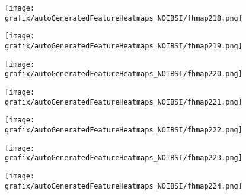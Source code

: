 \hspace{\hsp} 
\begin{subfigure}{\wid\textwidth} 
    \centering 
    \caption{\tiny \sffamily {}} 
    \vspace{\vsp} 
    \texttt{[image: grafix/autoGeneratedFeatureHeatmaps\_NOIBSI/fhmap218.png]} 
\end{subfigure} 
\hspace{\hsp} 
\begin{subfigure}{\wid\textwidth} 
    \centering 
    \caption{\tiny \sffamily {}} 
    \vspace{\vsp} 
    \texttt{[image: grafix/autoGeneratedFeatureHeatmaps\_NOIBSI/fhmap219.png]} 
\end{subfigure} 
\hspace{\hsp} 
\begin{subfigure}{\wid\textwidth} 
    \centering 
    \caption{\tiny \sffamily {}} 
    \vspace{\vsp} 
    \texttt{[image: grafix/autoGeneratedFeatureHeatmaps\_NOIBSI/fhmap220.png]} 
\end{subfigure} 
\hspace{\hsp} 
\begin{subfigure}{\wid\textwidth} 
    \centering 
    \caption{\tiny \sffamily {}} 
    \vspace{\vsp} 
    \texttt{[image: grafix/autoGeneratedFeatureHeatmaps\_NOIBSI/fhmap221.png]} 
\end{subfigure} 
\hspace{\hsp} 
\begin{subfigure}{\wid\textwidth} 
    \centering 
    \caption{\tiny \sffamily {}} 
    \vspace{\vsp} 
    \texttt{[image: grafix/autoGeneratedFeatureHeatmaps\_NOIBSI/fhmap222.png]} 
\end{subfigure} 
\hspace{\hsp} 
\begin{subfigure}{\wid\textwidth} 
    \centering 
    \caption{\tiny \sffamily {}} 
    \vspace{\vsp} 
    \texttt{[image: grafix/autoGeneratedFeatureHeatmaps\_NOIBSI/fhmap223.png]} 
\end{subfigure} 
\hspace{\hsp} 
\begin{subfigure}{\wid\textwidth} 
    \centering 
    \caption{\tiny \sffamily {}} 
    \vspace{\vsp} 
    \texttt{[image: grafix/autoGeneratedFeatureHeatmaps\_NOIBSI/fhmap224.png]} 
\end{subfigure} 
